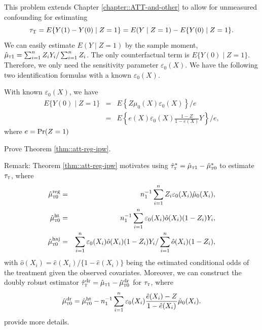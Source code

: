 \begin{HomeworkProblem}\label{exr:18-4}

This problem extends Chapter \ref{chapter::ATT-and-other} to allow for unmeasured confounding for estimating
\[
\tau_\textsc{T} = E\{  Y(1) - Y(0)  \mid Z=1  \}
= E(Y\mid Z=1) - E\{  Y(0)  \mid Z=1  \} .
\]
We can easily estimate $E(Y\mid Z=1)$ by the sample moment, $\hat{\mu}_{\textsc{t}1} =   \sum_{i=1}^n Z_i Y_i / \sum_{i=1}^n Z_i$. The only counterfactual term is $E\{  Y(0)  \mid Z=1  \}$. Therefore, we only need the sensitivity parameter $ \varepsilon_0(X) $. We have the following two identification formulas with a known  $\varepsilon_0(X) .$

\begin{Theorem}
\label{thm::att-reg-ipw}
With known $\varepsilon_0(X) $, we have
 \begin{eqnarray*}
E\{  Y(0)  \mid Z=1  \}  &=& E\left\{  Z \mu_0(X)  \varepsilon_0(X)    \right\} /e \\
&=& E\left\{  e(X)\varepsilon_0(X) \frac{ 1-Z}{1-e(X)}  Y      \right\} /e,
\end{eqnarray*}
where $e = \operatorname{Pr}(Z=1)$
\end{Theorem}


Prove Theorem \ref{thm::att-reg-ipw}.

Remark:  Theorem \ref{thm::att-reg-ipw} motivates using $\hat{\tau}_{\textsc{t}}^* = \hat{\mu}_{\textsc{t}1}  - \hat{\mu}_{\textsc{t}0}^*$ to estimate $\tau_{\textsc{t}}$, where
 \begin{eqnarray*}
\hat{\mu}_{\textsc{t}0}^\text{reg} &=& n_1^{-1} \sum_{i=1}^n Z_i  \varepsilon_0(X_i) \hat  \mu_0(X_i) ,   \\
\hat{\mu}_{\textsc{t}0}^\text{ht} &=& n_1^{-1} \sum_{i=1}^n   \varepsilon_0(X_i) \hat  o(X_i) (1-Z_i) Y_i ,   \\
\hat{\mu}_{\textsc{t}0}^\text{haj} &=&  \sum_{i=1}^n   \varepsilon_0(X_i) \hat  o(X_i) (1-Z_i) Y_i  /  \sum_{i=1}^n   \hat  o(X_i) (1-Z_i) ,
\end{eqnarray*}
with $  \hat  o(X_i) = \hat  e(X_i) / \{1- \hat  e(X_i)\}$ being the estimated conditional odds of the treatment given the observed covariates.
Moreover, we can construct the doubly robust estimator
$\hat{\tau}_{\textsc{t}}^\text{dr} = \hat{\mu}_{\textsc{t}1}  - \hat{\mu}_{\textsc{t}0}^\text{dr}$ for $\tau_{\textsc{t}}$, where
\[
\hat{\mu}_{\textsc{t}0}^\text{dr} =
\hat{\mu}_{\textsc{t}0}^\text{ht}  - n_1^{-1} \sum_{i=1}^n \varepsilon_0(X_i) \frac{\hat e(X_i) - Z}{1-\hat e(X_i)}  \hat \mu_0(X_i)  .
\]
\citet{luding2023flexible} provide more details.



\end{HomeworkProblem}

